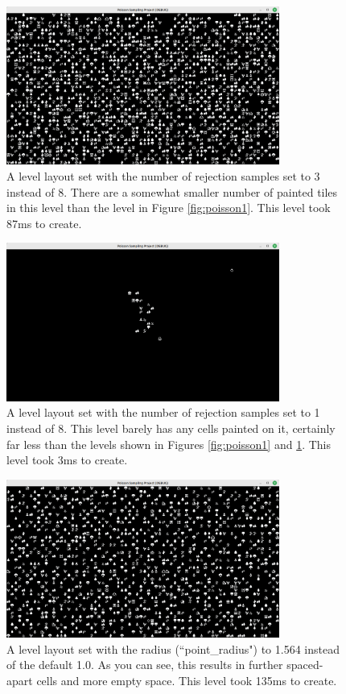 \begin{figure}[H]
    \centering
    \includegraphics[width=0.8\textwidth]{Images/poisson-3-samples.png}
    \caption{A level layout set with the number of rejection samples set to 3 instead of 8. There are a somewhat smaller number of painted tiles in this level than the level in Figure \ref{fig:poisson1}. This level took 87ms to create.}
    \label{fig:poisson2}
\end{figure}

\begin{figure}[H]
    \centering
    \includegraphics[width=0.8\textwidth]{Images/poisson-1-sample.png}
    \caption{A level layout set with the number of rejection samples set to 1 instead of 8. This level barely has any cells painted on it, certainly far less than the levels shown in Figures \ref{fig:poisson1} and \ref{fig:poisson2}. This level took 3ms to create.}
    \label{fig:poisson3}
\end{figure}

\begin{figure}[H]
    \centering
    \includegraphics[width=0.8\textwidth]{Images/poisson-radius-1.564.png}
    \caption{A level layout set with the radius (``point\_radius") to 1.564 instead of the default 1.0. As you can see, this results in further spaced-apart cells and more empty space. This level took 135ms to create.}
    \label{fig:poisson4}
\end{figure}